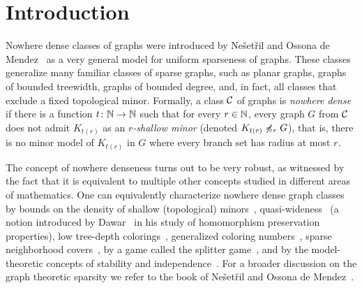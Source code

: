 \section{Introduction}

Nowhere dense classes of graphs were introduced 
by Ne\v set\v ril and Ossona de 
Mendez~\cite{nevsetvril2010first,nevsetvril2011nowhere} as a very 
general model
for uniform sparseness of graphs. These classes generalize many 
familiar classes of sparse graphs, such as planar graphs, graphs 
of bounded treewidth,  graphs of bounded degree, and, in fact, 
all classes that exclude a fixed 
topological minor.
Formally, a class $\mathcal{C}$ of graphs is {\em{nowhere dense}} if there is a function $t\colon \mathbb{N}\to \mathbb{N}$ such that for every $r\in \mathbb{N}$, every graph $G$ from $\mathcal{C}$ does not admit $K_{t(r)}$ as an {\em{$r$-shallow minor}}
(denoted $K_{t(r)}\not\preccurlyeq_r G$),
that is, there is no minor model of $K_{t(r)}$ in $G$ where every branch set has radius at most $r$.

The concept of nowhere denseness
turns out to be very robust, as witnessed by the fact that it is equivalent 
to multiple other concepts studied in different areas of mathematics. 
One can equivalently characterize nowhere dense graph classes 
by bounds on the density of shallow (topological)
minors~\cite{nevsetvril2010first,nevsetvril2011nowhere},
quasi-wideness~\cite{nevsetvril2011nowhere} (a notion introduced by
Dawar~\cite{dawar2010homomorphism} in his study of homomorphism
preservation properties), low tree-depth
colorings~\cite{nevsetvril2008grad}, generalized coloring
numbers~\cite{zhu2009coloring}, sparse neighborhood
covers~\cite{GroheKRSS15,grohe2014deciding}, by a game called the
splitter game~\cite{grohe2014deciding}, and by the model-theoretic
concepts of stability and independence~\cite{adler2014interpreting}.
For a broader discussion on the graph theoretic sparsity we refer to the book
of Ne\v{s}et\v{r}il and Ossona de Mendez~\cite{sparsity}.

